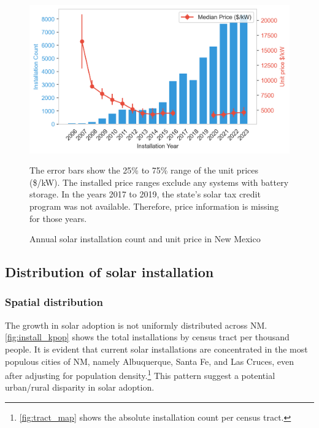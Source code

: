 \documentclass[11pt,twoside,letterpaper]{article}
\begin{document}
\begin{figure}[H]
    \centering
\includegraphics[width=1\textwidth]{figures/installation_count_price.png}
    \caption{Annual solar installation count and unit price in New Mexico}
    \label{fig:installation_count}
    \begin{flushleft}
        \footnotesize The error bars show the 25\% to 75\% range of the unit prices (\$/kW). The installed price ranges exclude any systems with battery storage. In the years 2017 to 2019, the state’s solar tax credit program was not available. Therefore, price information is missing for those years.
    \end{flushleft}
\end{figure}

\subsection{Distribution of solar installation}

\subsubsection{Spatial distribution}
\label{subsec:Spatial distribution}

The growth in solar adoption is not uniformly distributed across NM. \autoref{fig:install_kpop} shows the total installations by census tract per thousand people. It is evident that current solar installations are concentrated in the most populous cities of NM, namely Albuquerque, Santa Fe, and Las Cruces, even after adjusting for population density.\footnote{\autoref{fig:tract_map} shows the absolute installation count per census tract.} This pattern suggest a potential urban/rural disparity in solar adoption.
\end{document}
